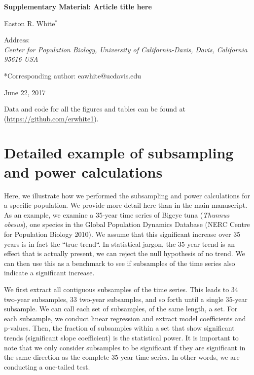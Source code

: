 \documentclass[12pt,]{article}
\title{}
\author{}
\date{}
\begin{document}
\vspace{2cm}

\begin{center}
 \textbf{Supplementary Material: Article title here}
 
Easton R. White$^{*}$
\vspace{3 mm}

Address: \\ \emph{Center for Population Biology, University of California-Davis, Davis, California 95616 USA}

*Corresponding author: eawhite@ucdavis.edu

June 22, 2017
 \end{center}

\vspace{2cm}

\tableofcontents

\vspace{1cm}

Data and code for all the figures and tables can be found at
(\url{https://github.com/erwhite1}).

\vspace{2cm}

\clearpage

\section{Detailed example of subsampling and power
calculations}\label{detailed-example-of-subsampling-and-power-calculations}

Here, we illustrate how we performed the subsampling and power
calculations for a specific population. We provide more detail here than
in the main manuscript. As an example, we examine a 35-year time series
of Bigeye tuna (\emph{Thunnus obesus}), one species in the Global
Population Dynamics Database (NERC Centre for Population Biology 2010).
We assume that this significant increase over 35 years is in fact the
``true trend``. In statistical jargon, the 35-year trend is an effect
that is actually present, we can reject the null hypothesis of no trend.
We can then use this as a benchmark to see if subsamples of the time
series also indicate a significant increase.

We first extract all contiguous subsamples of the time series. This
leads to 34 two-year subsamples, 33 two-year subsamples, and so forth
until a single 35-year subsample. We can call each set of subsamples, of
the same length, a set. For each subsample, we conduct linear regression
and extract model coefficients and p-values. Then, the fraction of
subsamples within a set that show significant trends (significant slope
coefficient) is the statistical power. It is important to note that we
only consider subsamples to be significant if they are significant in
the same direction as the complete 35-year time series. In other words,
we are conducting a one-tailed test.
\end{document}
